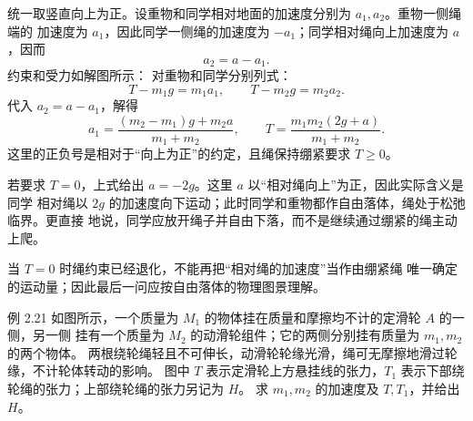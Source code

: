 \begin{xesolution}
统一取竖直向上为正。设重物和同学相对地面的加速度分别为 $a_1,a_2$。重物一侧绳端的
加速度为 $a_1$，因此同学一侧绳的加速度为 $-a_1$；同学相对绳向上加速度为 $a$，因而
\[
 \boxed{a_2=a-a_1}.
\]
约束和受力如解图所示：
\soldiagTwoTwenty
对重物和同学分别列式：
\[
 T-m_1g=m_1a_1,
 \qquad
 T-m_2g=m_2a_2.
\]
代入 $a_2=a-a_1$，解得
\[
 \boxed{a_1=\frac{(m_2-m_1)g+m_2a}{m_1+m_2}},
 \qquad
 \boxed{T=\frac{m_1m_2(2g+a)}{m_1+m_2}}.
\]
这里的正负号是相对于“向上为正”的约定，且绳保持绷紧要求 $T\ge0$。

若要求 $T=0$，上式给出 $a=-2g$。这里 $a$ 以“相对绳向上”为正，因此实际含义是同学
相对绳以 $2g$ 的加速度向下运动；此时同学和重物都作自由落体，绳处于松弛临界。更直接
地说，同学应放开绳子并自由下落，而不是继续通过绷紧的绳主动上爬。

当 $T=0$ 时绳约束已经退化，不能再把“相对绳的加速度”当作由绷紧绳
唯一确定的运动量；因此最后一问应按自由落体的物理图景理解。
\end{xesolution}

\begin{origexamplebox}{例 2.21}
如图所示，一个质量为 $M_1$ 的物体挂在质量和摩擦均不计的定滑轮 $A$ 的一侧，另一侧
挂有一个质量为 $M_2$ 的动滑轮组件；它的两侧分别挂有质量为 $m_1,m_2$ 的两个物体。
两根绕轮绳轻且不可伸长，动滑轮轮缘光滑，绳可无摩擦地滑过轮缘，不计轮体转动的影响。
图中 $T$ 表示定滑轮上方悬挂线的张力，$T_1$ 表示下部绕轮绳的张力；上部绕轮绳的张力另记为 $H$。
求 $m_1,m_2$ 的加速度及 $T,T_1$，并给出 $H$。
\probdiagTwoTwentyOne
\end{origexamplebox}

